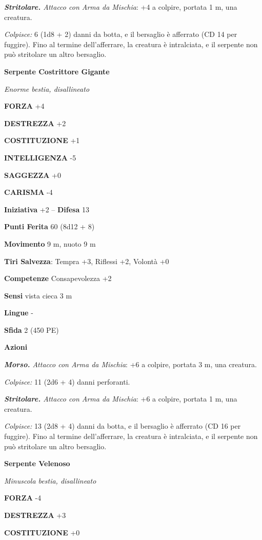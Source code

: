 \begin{multicols}{2}
\emph{\textbf{Stritolare.} Attacco con Arma da Mischia}: +4 a colpire, portata 1 m, una creatura.

\emph{Colpisce:} 6 (1d8 + 2) danni da botta, e il bersaglio è afferrato (CD 14 per fuggire). Fino al termine dell'afferrare, la creatura è intralciata, e il serpente non può stritolare un altro bersaglio.

\medskip\textbf{Serpente Costrittore Gigante}

\emph{Enorme bestia, disallineato}

\textbf{FORZA} +4

\textbf{DESTREZZA} +2

\textbf{COSTITUZIONE} +1

\textbf{INTELLIGENZA} -5

\textbf{SAGGEZZA} +0

\textbf{CARISMA} -4

\textbf{Iniziativa} +2 -- \textbf{Difesa} 13

\textbf{Punti Ferita} 60 (8d12 + 8)

\textbf{Movimento} 9 m, nuoto 9 m

\textbf{Tiri Salvezza}: Tempra +3, Riflessi +2, Volontà +0

\textbf{Competenze} Consapevolezza +2

\textbf{Sensi} vista cieca 3 m

\textbf{Lingue} -

\textbf{Sfida} 2 (450 PE)

\textbf{Azioni}

\emph{\textbf{Morso.} Attacco con Arma da Mischia}: +6 a colpire, portata 3 m, una creatura.

\emph{Colpisce:} 11 (2d6 + 4) danni perforanti.

\emph{\textbf{Stritolare.} Attacco con Arma da Mischia}: +6 a colpire, portata 1 m, una creatura.

\emph{Colpisce:} 13 (2d8 + 4) danni da botta, e il bersaglio è afferrato (CD 16 per fuggire). Fino al termine dell'afferrare, la creatura è intralciata, e il serpente non può stritolare un altro bersaglio.

\medskip\textbf{Serpente Velenoso}

\emph{Minuscola bestia, disallineato}

\textbf{FORZA} -4

\textbf{DESTREZZA} +3

\textbf{COSTITUZIONE} +0


\end{multicols}

